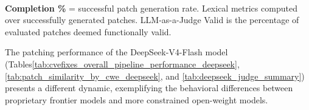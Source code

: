 \begin{table}[H]
  \centering
  \caption{CVEFixes: Overall Pipeline Performance Summary on DeepSeek-V4-Flash}
  \label{tab:cvefixes_overall_pipeline_performance_deepseek}
  \\[2pt]
  {\scriptsize \textbf{Completion \%} = successful patch generation rate. Lexical metrics computed over successfully generated patches. LLM-as-a-Judge Valid is the percentage of evaluated patches deemed functionally valid.}
\end{table}

The patching performance of the DeepSeek-V4-Flash model (Tables\ref{tab:cvefixes_overall_pipeline_performance_deepseek}, \ref{tab:patch_similarity_by_cwe_deepseek}, and \ref{tab:deepseek_judge_summary}) presents a different dynamic, exemplifying the behavioral differences between proprietary frontier models and more constrained open-weight models. 

